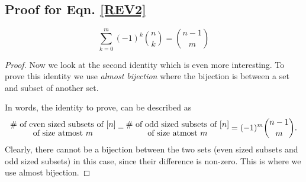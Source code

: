 \subsection{Proof for Eqn. \eqref{REV2}} \label{subsec:identity-even-odd-2}
$$\sum_{k=0}^m (-1)^k{n\choose k} = {n-1\choose m}$$
\begin{proof}
Now we look at the second identity which is even more interesting. To prove this identity we use \emph{almost bijection} where the bijection is between a set and subset of another set.

In words, the identity to prove, can be described as
$$\Large\substack{\# \textrm{ of even sized subsets of  $[n]$}\\  \textrm{of size atmost $m$}} - \substack{\# \textrm{ of odd sized subsets of $[n]$} \\ \textrm{of size atmost $m$}} = (-1)^m{n-1\choose m}.$$ Clearly, there cannot be a bijection between the two sets (even sized subsets and odd sized subsets) in this case, since their difference is non-zero. This is where we use almost bijection.


\end{proof}
